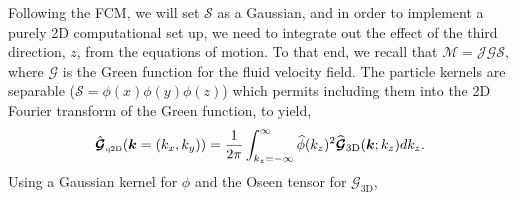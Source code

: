 \documentclass[ twoside,openright,titlepage,numbers=noenddot,%
headinclude,footinclude,cleardoublepage=empty,abstract=on,
BCOR=5mm,paper=b5,fontsize=11pt, dvipsnames
]{scrreprt}
\renewcommand{\vec}[1]{\bm{#1}}
\newcommand{\tens}[1]{\bm{\mathcal{#1}}}
\newcommand{\oper}[1]{\mathcal{#1}}
\newcommand{\fou}[1]{\widehat{#1}}
\newcommand{\qtd}{\text{\tiny q2D}}
\begin{document}
Following the \gls{FCM}, we will set $\oper{S}$ as a Gaussian, and in order to implement a purely 2D computational set up, we need to integrate out the effect of the third direction, $z$, from the equations of motion. To that end, we recall that $\tens{M} = \oper{J}\tens{G}\oper{S}$, where $\tens{G}$ is the Green function for the fluid velocity field. The particle kernels are separable ($\oper{S} = \phi(x)\phi(y)\phi(z)$) which permits including them into the 2D Fourier transform of the Green function, to yield,
\begin{equation}
  \hat{\tens{G}}_{\qtd}(\vec{k} = (k_x, k_y)) = \frac{1}{2\pi}\int_{k_z=-\infty}^\infty\fou{\phi}(k_z)^2\fou{\tens{G}}_{\text{3D}}(\vec{k};k_z)dk_z.
\end{equation}
Using a Gaussian kernel for $\phi$ and the Oseen tensor for $\tens{G}_{\text{3D}}$,
\end{document}
